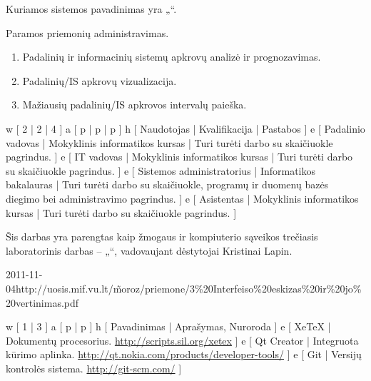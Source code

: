Kuriamos sistemos pavadinimas yra „\systemname“.

Paramos priemonių administravimas.

\begin{enumerate}
  \item Padalinių ir informacinių sistemų apkrovų analizė ir prognozavimas.
  \item Padalinių/IS apkrovų vizualizacija.
  \item Mažiausių padalinių/IS apkrovos intervalų paieška.
\end{enumerate}

\xtable
{
  w [ 2 | 2 | 4 ]
  a [ p | p | p ]
  h [ Naudotojas | Kvalifikacija | Pastabos ]
  e [ Padalinio vadovas | Mokyklinis informatikos kursas
  | Turi turėti darbo su skaičiuokle pagrindus.
  ]
  e [ IT vadovas | Mokyklinis informatikos kursas
  | Turi turėti darbo su skaičiuokle pagrindus.
  ]
  e [ Sistemos administratorius | Informatikos bakalauras
  | Turi turėti darbo su skaičiuokle, programų ir duomenų bazės diegimo
  bei administravimo pagrindus.
  ]
  e [ Asistentas | Mokyklinis informatikos kursas
  | Turi turėti darbo su skaičiuokle pagrindus.
  ]
}

Šis darbas yra parengtas kaip žmogaus ir kompiuterio sąveikos
trečiasis laboratorinis darbas – „\docname“, vadovaujant
dėstytojai Kristinai Lapin.

\xdoclist
{
  {2011-11-04}{http://uosis.mif.vu.lt/\~moroz/priemone/3\%20Interfeiso\%20eskizas\%20ir\%20jo\%20vertinimas.pdf}
}

\xtableu
{
  w [ 1 | 3 ]
  a [ p | p ]
  h [ Pavadinimas | Aprašymas, Nuroroda ]
  e [ XeTeX | Dokumentų procesorius. \newline \url{http://scripts.sil.org/xetex} ]
  e [ Qt Creator | Integruota kūrimo aplinka. \newline \url{http://qt.nokia.com/products/developer-tools/} ]
  e [ Git | Versijų kontrolės sistema. \newline \url{http://git-scm.com/} ]
}
